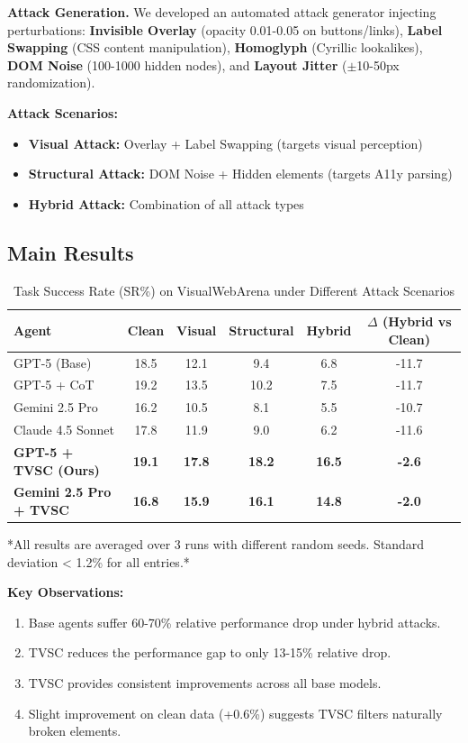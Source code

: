 \documentclass{llncs}
\begin{document}
\textbf{Attack Generation.} We developed an automated attack generator injecting perturbations: \textbf{Invisible Overlay} (opacity 0.01-0.05 on buttons/links), \textbf{Label Swapping} (CSS content manipulation), \textbf{Homoglyph} (Cyrillic lookalikes), \textbf{DOM Noise} (100-1000 hidden nodes), and \textbf{Layout Jitter} ($\pm$10-50px randomization).


\textbf{Attack Scenarios:}
\begin{itemize}
    \item \textbf{Visual Attack:} Overlay + Label Swapping (targets visual perception)
    \item \textbf{Structural Attack:} DOM Noise + Hidden elements (targets A11y parsing)
    \item \textbf{Hybrid Attack:} Combination of all attack types
\end{itemize}

\subsection{Main Results}

\begin{table}[ht]
\caption{Task Success Rate (SR\%) on VisualWebArena under Different Attack Scenarios}
\centering
\begin{tabular}{|l|c|c|c|c|c|}
\hline
Agent & Clean & Visual & Structural & Hybrid & $\Delta$ (Hybrid vs Clean) \\
\hline
GPT-5 (Base) & 18.5 & 12.1 & 9.4 & 6.8 & -11.7 \\
GPT-5 + CoT & 19.2 & 13.5 & 10.2 & 7.5 & -11.7 \\
Gemini 2.5 Pro & 16.2 & 10.5 & 8.1 & 5.5 & -10.7 \\
Claude 4.5 Sonnet & 17.8 & 11.9 & 9.0 & 6.2 & -11.6 \\
\textbf{GPT-5 + TVSC (Ours)} & \textbf{19.1} & \textbf{17.8} & \textbf{18.2} & \textbf{16.5} & \textbf{-2.6} \\
\textbf{Gemini 2.5 Pro + TVSC} & \textbf{16.8} & \textbf{15.9} & \textbf{16.1} & \textbf{14.8} & \textbf{-2.0} \\
\hline
\end{tabular}
\end{table}
\small{*All results are averaged over 3 runs with different random seeds. Standard deviation < 1.2\% for all entries.*}

\textbf{Key Observations:}
\begin{enumerate}
    \item Base agents suffer 60-70\% relative performance drop under hybrid attacks.
    \item TVSC reduces the performance gap to only 13-15\% relative drop.
    \item TVSC provides consistent improvements across all base models.
    \item Slight improvement on clean data (+0.6\%) suggests TVSC filters naturally broken elements.
\end{enumerate}
\end{document}
